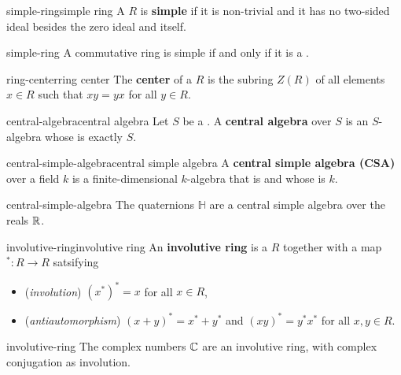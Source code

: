 \begin{topic}{simple-ring}{simple ring}
    A  $R$ is \textbf{simple} if it is non-trivial and it has no two-sided ideal besides the zero ideal and itself.
\end{topic}

\begin{example}{simple-ring}
    A commutative ring is simple if and only if it is a .
\end{example}

\begin{topic}{ring-center}{ring center}
    The \textbf{center} of a  $R$ is the subring $Z(R)$ of all elements $x \in R$ such that $xy = yx$ for all $y \in R$.
\end{topic}

\begin{topic}{central-algebra}{central algebra}
    Let $S$ be a . A \textbf{central algebra} over $S$ is an $S$-algebra whose  is exactly $S$.
\end{topic}

\begin{topic}{central-simple-algebra}{central simple algebra}
    A \textbf{central simple algebra (CSA)} over a field $k$ is a finite-dimensional $k$-algebra that is  and whose  is $k$.
\end{topic}

\begin{example}{central-simple-algebra}
    The quaternions $\mathbb{H}$ are a central simple algebra over the reals $\mathbb{R}$.
\end{example}

\begin{topic}{involutive-ring}{involutive ring}
    An \textbf{involutive ring} is a  $R$ together with a map $^* : R \to R$ satsifying
    \begin{itemize}
        \item (\textit{involution}) $(x^*)^* = x$ for all $x \in R$,
        \item (\textit{antiautomorphism}) $(x + y)^* = x^* + y^*$ and $(xy)^* = y^* x^*$ for all $x, y \in R$.
    \end{itemize}
\end{topic}

\begin{example}{involutive-ring}
    The complex numbers $\mathbb{C}$ are an involutive ring, with complex conjugation as involution.
\end{example}


